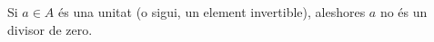 Si $a \in A$ és una unitat (o sigui, un element invertible), aleshores $a$ no és un divisor de zero.